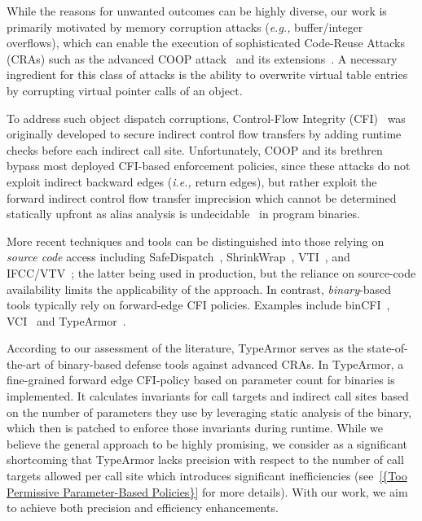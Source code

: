 While the reasons for unwanted outcomes can be highly diverse, our work is primarily motivated by memory corruption attacks (\textit{e.g.,} buffer/integer overflows), which can enable the 
execution of sophisticated Code-Reuse Attacks (CRAs) such as the advanced COOP attack~\cite{schuster:coop} and its 
extensions~\cite{crane:readactor++, crane:readactor++, subversive-c:lettner, ctf:coop, loop:oriented}. A necessary ingredient for this class of attacks is the ability to overwrite
virtual table entries by corrupting  virtual pointer calls of an object.

To address such object dispatch corruptions, Control-Flow Integrity (CFI)~\cite{abadi:cfi2, abadi:cfi} was originally developed to secure indirect control flow transfers by adding 
runtime checks before each indirect call site. Unfortunately, COOP and its brethren bypass most deployed CFI-based enforcement policies, since these attacks do not exploit indirect 
backward edges (\textit{i.e.,} return edges), but rather exploit the forward indirect control flow transfer imprecision which cannot be determined statically upfront as alias analysis is 
undecidable~\cite{alias:undecidable} in program binaries.

More recent techniques and tools can be distinguished into those relying on \textit{source code} access including SafeDispatch~\cite{safedispatch:jang}, ShrinkWrap~\cite{haller:shrinkwrap}, 
VTI~\cite{bounov:interleaving}, and IFCC/VTV~\cite{vtv:tice}; the latter being used in production, but the reliance on source-code availability limits the applicability of the approach. 
In contrast, \textit{binary}-based tools typically rely on forward-edge CFI policies. Examples include binCFI~\cite{ccfir:zhang, zhang:usenix}, VCI~\cite{vci:asiaccs} and 
TypeArmor~\cite{veen:typearmor}. 

According to our assessment of the literature, TypeArmor serves as the state-of-the-art of binary-based defense tools against advanced CRAs. In TypeArmor, a fine-grained 
forward edge CFI-policy based on parameter count for binaries is implemented. It calculates invariants for call targets and indirect call sites based on the number of parameters they use 
by leveraging static analysis of the binary, which then is patched to enforce those invariants during runtime. While we believe the general approach to be highly promising, we consider 
as a significant shortcoming that TypeArmor lacks precision with respect to the number of call targets allowed per call site which introduces significant 
inefficiencies (see~\cref{{Too Permissive Parameter-Based Policies}} for more details). With our work, we aim to achieve both precision and efficiency enhancements.


